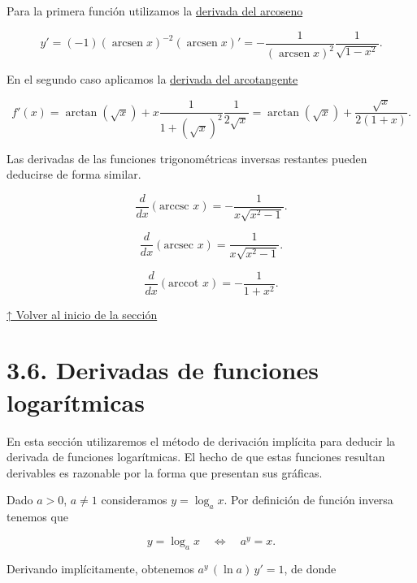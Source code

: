 \documentclass[
  letterpaper,
]{book}
\theoremstyle{plain}
\theoremstyle{remark}
\begin{document}
\begin{tcolorbox}[enhanced jigsaw, opacityback=0, left=2mm, opacitybacktitle=0.6, toprule=.15mm, bottomrule=.15mm, colbacktitle=quarto-callout-tip-color!10!white, titlerule=0mm, bottomtitle=1mm, title=\textcolor{quarto-callout-tip-color}{\faLightbulb}\hspace{0.5em}{Solución}, toptitle=1mm, colframe=quarto-callout-tip-color-frame, colback=white, breakable, rightrule=.15mm, arc=.35mm, leftrule=.75mm, coltitle=black]

Para la primera función utilizamos la
\hyperref[form-derivada-arcoseno]{derivada del arcoseno}

\[
y'=(-1)(\operatorname{arcsen} x)^{-2} (\operatorname{arcsen} x)'=-\frac{1}{(\operatorname{arcsen} x)^{2}}\frac{1}{\sqrt{1-x^2}}.
\]

En el segundo caso aplicamos la
\hyperref[form-derivada-arcotangente]{derivada del arcotangente}

\[
f'(x)=\arctan(\sqrt{x})+x\frac{1}{1+(\sqrt{x})^2}\frac{1}{2\sqrt{x}}=\arctan(\sqrt{x})+\frac{\sqrt{x}}{2(1+x)}.
\]

\end{tcolorbox}

Las derivadas de las funciones trigonométricas inversas restantes pueden
deducirse de forma similar.

\[
\frac{d}{dx}(\text{arccsc } x)=-\frac{1}{x\sqrt{x^2-1}}.            
\]

\[
\frac{d}{dx}(\text{arcsec } x)=\frac{1}{x\sqrt{x^2-1}}.
\]

\[
\frac{d}{dx}(\text{arccot } x)=-\frac{1}{1+x^2}.
\]

\hyperref[seccion_3.5]{↑ Volver al inicio de la sección}

\section{3.6. Derivadas de funciones logarítmicas}\label{seccion_3.6}

En esta sección utilizaremos el método de derivación implícita para
deducir la derivada de funciones logarítmicas. El hecho de que estas
funciones resultan derivables es razonable por la forma que presentan
sus gráficas.

Dado \(a>0\), \(a\neq 1\) consideramos \(y=\log_a x\). Por definición de
función inversa tenemos que

\[
y=\log_a x\quad\Longleftrightarrow\quad a^y=x.
\]

Derivando implícitamente, obtenemos \(a^y\,(\ln a)\, y'=1\), de donde
\end{document}
